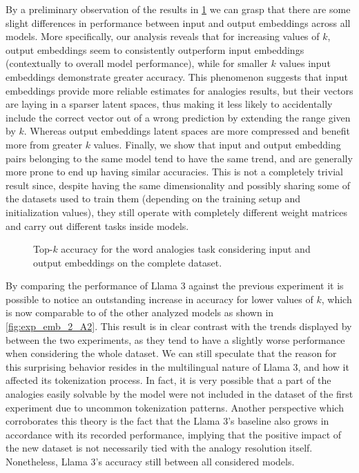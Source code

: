 By a preliminary observation of the results in \cref{fig:exp_emb_2_A} we can grasp that there are some slight differences in performance between input and output embeddings across all models.
More specifically, our analysis reveals that for increasing values of $k$, output embeddings seem to consistently outperform input embeddings (contextually to overall model performance), while for smaller $k$ values input embeddings demonstrate greater accuracy.
This phenomenon suggests that input embeddings provide more reliable estimates for analogies results, but their vectors are laying in a sparser latent spaces, thus making it less likely to accidentally include the correct vector out of a wrong prediction by extending the range given by $k$.
Whereas output embeddings latent spaces are more compressed and benefit more from greater $k$ values.
Finally, we show that input and output embedding pairs belonging to the same model tend to have the same trend, and are generally more prone to end up having similar accuracies.
This is not a completely trivial result since, despite having the same dimensionality and possibly sharing some of the datasets used to train them (depending on the training setup and initialization values), they still operate with completely different weight matrices and carry out different tasks inside models.

\begin{figure}[t!]
    \centering
    \caption{Top-$k$ accuracy for the word analogies task considering input and output embeddings on the complete dataset.}
    \label{fig:exp_emb_2_A}
\end{figure}

By comparing the performance of Llama 3 against the previous experiment it is possible to notice an outstanding increase in accuracy for lower values of $k$, which is now comparable to  of the other analyzed models as shown in \cref{fig:exp_emb_2_A2}.
This result is in clear contrast with the trends displayed by  between the two experiments, as they tend to have a slightly worse performance when considering the whole dataset.
We can still speculate that the reason for this surprising behavior resides in the multilingual nature of Llama 3, and how it affected its tokenization process.
In fact, it is very possible that a part of the analogies easily solvable by the model were not included in the dataset of the first experiment due to uncommon tokenization patterns.
Another perspective which corroborates this theory is the fact that the Llama 3's baseline also grows in accordance with its recorded performance, implying that the positive impact of the new dataset is not necessarily tied with the analogy resolution  itself.
Nonetheless, Llama 3's accuracy still  between all considered models. 

